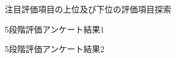 \documentclass[syuuron]{kuee}
\begin{document}
		\begin{figure}
			\begin{center}
			\end{center}
			\caption{注目評価項目の上位及び下位の評価項目探索}
	  		\label{fig:cas2}
		\end{figure}
		\begin{figure}
			\begin{center}
			\end{center}
			\caption{5段階評価アンケート結果1}
	  		\label{fig:res7}
		\end{figure}
		\begin{figure}
			\begin{center}
			\end{center}
			\caption{5段階評価アンケート結果2}
	  		\label{fig:res8}
		\end{figure}
\end{document}
